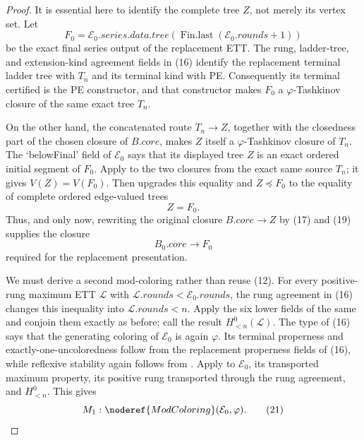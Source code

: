 \begin{proof}
It is essential here to identify the complete tree \(Z\), not merely its
vertex set.  Let
\[
 F_0=\mathcal E_0.\mathit{series.data.tree}
       (\operatorname{Fin.last}(\mathcal E_0.\mathit{rounds}+1))  \tag{18}
\]
be the exact final series output of the replacement ETT.  The rung,
ladder-tree, and extension-kind agreement fields in (16) identify the
replacement terminal ladder tree with \(T_n\) and its terminal kind with PE.
Consequently its terminal certified  is the PE
constructor, and that constructor makes \(F_0\) a
\(\varphi\)-Tashkinov closure of the same exact tree \(T_n\).

On the other hand, the concatenated route \(T_n\longrightarrow Z\), together
with the closedness part of the chosen closure of
\(B.\mathit{core}\), makes \(Z\) itself a
\(\varphi\)-Tashkinov closure of \(T_n\).  The `belowFinal' field of
\(\mathcal E_0\) says that its displayed tree \(Z\) is an exact ordered
initial segment of \(F_0\).  Apply
 to the two closures from the exact
same source \(T_n\); it gives
\(V(Z)=V(F_0)\).  Then
 upgrades this equality and
\(Z\preccurlyeq F_0\) to the equality of complete ordered edge-valued trees
\[
                              Z=F_0.                              \tag{19}
\]
Thus, and only now, rewriting the original closure
\(B.\mathit{core}\longrightarrow Z\) by (17) and (19) supplies the closure
\[
              B_0.\mathit{core}\longrightarrow F_0              \tag{20}
\]
required for the replacement presentation.

We must derive a second mod-coloring rather than reuse (12).  For every
positive-rung maximum ETT \(\mathcal L\) with
\(\mathcal L.\mathit{rounds}<\mathcal E_0.\mathit{rounds}\), the rung
agreement in (16) changes this inequality into
\(\mathcal L.\mathit{rounds}<n\).  Apply the six lower fields of the same
 and conjoin them exactly as before;
call the result \(H^0_{<n}(\mathcal L)\).  The type of (16) says that the
generating coloring of \(\mathcal E_0\) is again \(\varphi\).  Its terminal
properness and exactly-one-uncoloredness follow from the replacement
properness fields of (16), while reflexive stability again follows from
.  Apply  to \(\mathcal E_0\), its transported
maximum property, its positive rung transported through the rung agreement,
and \(H^0_{<n}\).  This gives
\[
                         M_1:\noderef{ModColoring}(\mathcal E_0,\varphi).
                                                                    \tag{21}
\]


\end{proof}
